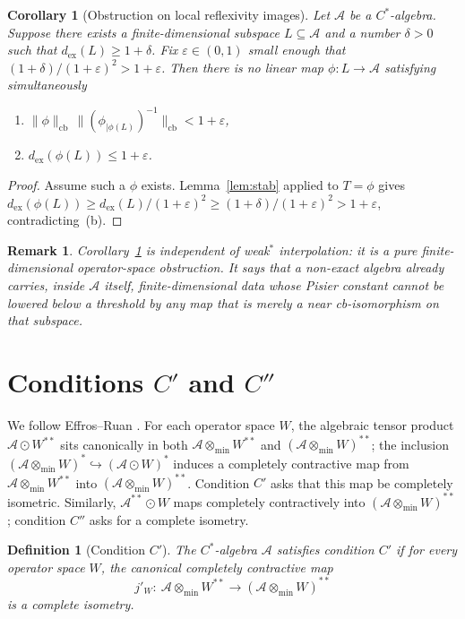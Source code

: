 \documentclass[12pt]{article}
\newtheorem{corollary}[theorem]{Corollary}
\newtheorem{definition}[theorem]{Definition}
\newtheorem{remark}[theorem]{Remark}
\newcommand{\A}{\mathcal A}
\newcommand{\otmin}{\otimes_{\min}}
\newcommand{\dex}{d_{\mathrm{ex}}}
\begin{document}
\begin{corollary}[Obstruction on local reflexivity images]\label{cor:obstr}
Let $\A$ be a $C^*$-algebra.  Suppose there exists a finite-dimensional subspace $L\subseteq \A$ and a number $\delta>0$ such that $\dex(L)\ge 1+\delta$.  Fix $\varepsilon\in(0,1)$ small enough that $(1+\delta)/(1+\varepsilon)^2>1+\varepsilon$.  Then there is \emph{no} linear map $\phi:L\to \A$ satisfying simultaneously
\begin{enumerate}[label=(\alph*),leftmargin=2.4em]
\item $\|\phi\|_{\mathrm{cb}}\,\|(\phi_{|\phi(L)})^{-1}\|_{\mathrm{cb}}<1+\varepsilon$,
\item $\dex(\phi(L))\le 1+\varepsilon$.
\end{enumerate}
\end{corollary}

\begin{proof}
Assume such a $\phi$ exists.  Lemma~\ref{lem:stab} applied to $T=\phi$ gives
$\dex(\phi(L))\ge \dex(L)/(1+\varepsilon)^2\ge (1+\delta)/(1+\varepsilon)^2>1+\varepsilon$, contradicting~(b).
\end{proof}

\begin{remark}
Corollary~\ref{cor:obstr} is independent of weak$^*$ interpolation: it is a pure finite-dimensional operator-space obstruction.  It says that a non-exact algebra already carries, inside $\A$ itself, finite-dimensional data whose Pisier constant cannot be lowered below a threshold by any map that is merely a near cb-isomorphism on that subspace.
\end{remark}

\section{\texorpdfstring{Conditions $C'$ and $C''$}{Conditions C' and C''}}\label{sec:cc}

We follow Effros--Ruan \cite[\S17.1]{ER}.  For each operator space $W$, the algebraic tensor product $\A\odot W^{**}$ sits canonically in both $\A\otmin W^{**}$ and $(\A\otmin W)^{**}$; the inclusion $(\A\otmin W)^*\hookrightarrow(\A\odot W)^*$ induces a completely contractive map from $\A\otmin W^{**}$ into $(\A\otmin W)^{**}$.  Condition $C'$ asks that this map be completely isometric.  Similarly, $\A^{**}\odot W$ maps completely contractively into $(\A\otmin W)^{**}$; condition $C''$ asks for a complete isometry.

\begin{definition}[Condition $C'$]\label{def:cp}
The $C^*$-algebra $\A$ satisfies \emph{condition $C'$} if for every operator space $W$, the canonical completely contractive map
\[
        j'_W:\ \A\otmin W^{**}\longrightarrow (\A\otmin W)^{**}
\]
is a complete isometry.
\end{definition}
\end{document}
